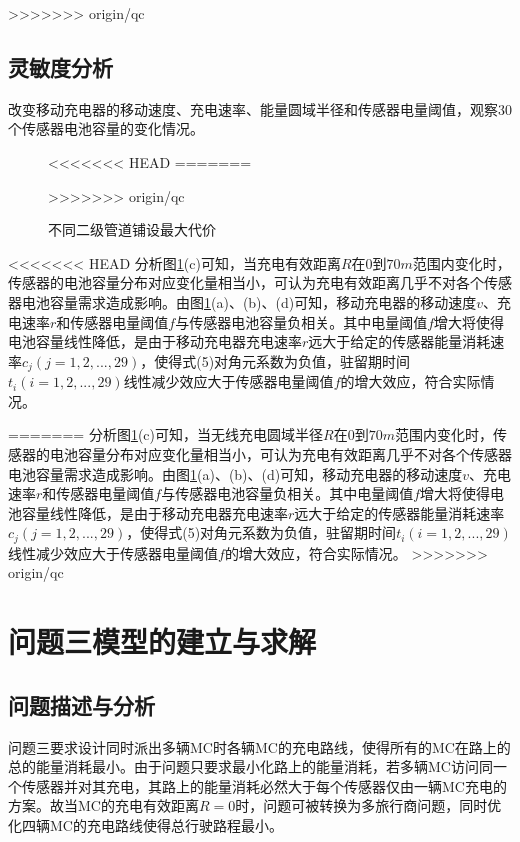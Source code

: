 \documentclass{whutmod}
\begin{document}
\begin{table}[H]
\begin{tablenotes}
>>>>>>> origin/qc
        \subsection{灵敏度分析}

		改变移动充电器的移动速度、充电速率、能量圆域半径和传感器电量阈值，观察$30$个传感器电池容量的变化情况。
		
	\begin{figure}[H]
		\centering
<<<<<<< HEAD
=======

>>>>>>> origin/qc
	\end{figure}	
	\begin{figure}[H]
		\centering
		\caption{不同二级管道铺设最大代价}
		\label{mgh}
	\end{figure}
<<<<<<< HEAD
		分析图\ref{mgh}(c)可知，当充电有效距离$R$在$0$到$70m$范围内变化时，传感器的电池容量分布对应变化量相当小，可认为充电有效距离几乎不对各个传感器电池容量需求造成影响。由图\ref{mgh}(a)、(b)、(d)可知，移动充电器的移动速度$v$、充电速率$r$和传感器电量阈值$f$与传感器电池容量负相关。其中电量阈值$f$增大将使得电池容量线性降低，是由于移动充电器充电速率$r$远大于给定的传感器能量消耗速率$c_j(j=1,2,...,29)$，使得式(5)对角元系数为负值，驻留期时间$t_i(i=1,2,...,29)$线性减少效应大于传感器电量阈值$f$的增大效应，符合实际情况。

=======
		分析图\ref{mgh}(c)可知，当无线充电圆域半径$R$在$0$到$70m$范围内变化时，传感器的电池容量分布对应变化量相当小，可认为充电有效距离几乎不对各个传感器电池容量需求造成影响。由图\ref{mgh}(a)、(b)、(d)可知，移动充电器的移动速度$v$、充电速率$r$和传感器电量阈值$f$与传感器电池容量负相关。其中电量阈值$f$增大将使得电池容量线性降低，是由于移动充电器充电速率$r$远大于给定的传感器能量消耗速率$c_j(j=1,2,...,29)$，使得式(5)对角元系数为负值，驻留期时间$t_i(i=1,2,...,29)$线性减少效应大于传感器电量阈值$f$的增大效应，符合实际情况。
>>>>>>> origin/qc

    \section{问题三模型的建立与求解}
    \subsection{问题描述与分析}
    问题三要求设计同时派出多辆MC时各辆MC的充电路线，使得所有的MC在路上的总的能量消耗最小。由于问题只要求最小化路上的能量消耗，若多辆MC访问同一个传感器并对其充电，其路上的能量消耗必然大于每个传感器仅由一辆MC充电的方案。故当MC的充电有效距离$R=0$时，问题可被转换为多旅行商问题，同时优化四辆MC的充电路线使得总行驶路程最小。
    

\end{tablenotes}
\end{table}
\end{document}
